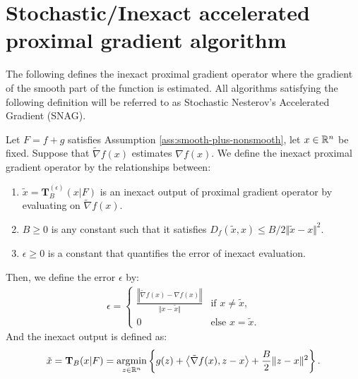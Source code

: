 \documentclass[12pt]{article}
\begin{document}
\section{Stochastic/Inexact accelerated proximal gradient algorithm}
    The following defines the inexact proximal gradient operator where the gradient of the smooth part of the function is estimated. 
    All algorithms satisfying the following definition will be referred to as Stochastic Nesterov's Accelerated Gradient (SNAG). 
    \begin{definition}
        Let $F = f + g$ satisfies Assumption \ref{ass:smooth-plus-nonsmooth}, let $x \in \mathbb R^n$ be fixed. 
        Suppose that $\tilde \nabla f(x)$ estimates $\nabla f(x)$. 
        We define the inexact proximal gradient operator by the relationships between: 
        \begin{enumerate}[nosep]
            \item $\tilde x = \mathbf T_B^{(\epsilon)}(x | F)$ is an inexact output of proximal gradient operator by evaluating on $\tilde \nabla f(x)$. 
            \item $B \ge 0$ is any constant such that it satisfies $D_f(\tilde x, x) \le B/2\Vert \tilde x - x\Vert^2$. 
            \item $\epsilon \ge 0$ is a constant that quantifies the error of inexact evaluation. 
        \end{enumerate}
        Then, we define the error $\epsilon$ by: 
        \begin{align*}
            \epsilon = \begin{cases}
                \frac{\left\Vert \tilde \nabla f(x) - \nabla f(x)\right\Vert}{\Vert x - \tilde x\Vert} & \text{if } x \neq \tilde x, 
                \\
                0 & \text{else } x = \tilde x. 
            \end{cases}
        \end{align*}
        And the inexact output is defined as: 
        \begin{align*}
            \tilde x = \mathbf T_B(x | F) = \mathop{\rm argmin}\limits_{z \in \mathbb R^n}\left\lbrace
                g(z) + \left\langle \tilde \nabla f(x), z - x\right\rangle
                + \frac{B}{2}\Vert z - x\Vert^2
            \right\rbrace. 
        \end{align*}
    \end{definition}
\end{document}
